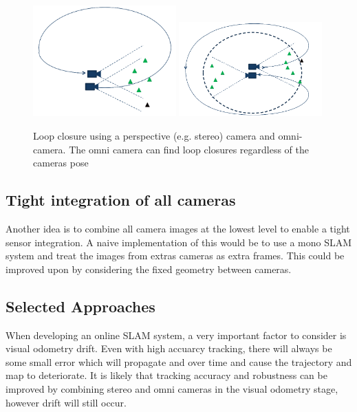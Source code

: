 \begin{figure}[h!]
  \centering
    \includegraphics[width=0.49\textwidth]{chapters/images/stereo_loop}
    \includegraphics[width=0.49\textwidth]{chapters/images/omni_loop} 
    \caption{Loop closure using a perspective (e.g. stereo) camera and omni-camera.  The omni camera can find loop closures regardless of the cameras pose}
  \label{fig:omni_loop_close}
\end{figure}

\subsection{Tight integration of all cameras}

Another idea is to combine all camera images at the lowest level to enable a tight sensor integration.  A naive implementation of this would be to use a mono SLAM system and treat the images from extras cameras as extra frames.  This could be improved upon by considering the fixed geometry between cameras.

\subsection{Selected Approaches}

When developing an online SLAM system, a very important factor to consider is visual odometry drift.  Even with high accuarcy tracking, there will always be some small error which will propagate and over time and cause the trajectory and map to deteriorate. It is likely that tracking accuracy and robustness can be improved by combining stereo and omni cameras in the visual odometry stage, however drift will still occur.

